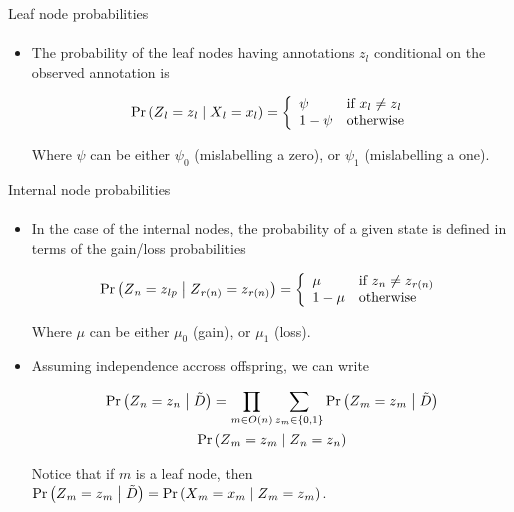 \documentclass[9pt,handout,ignorenonframetext,]{beamer}
\newcommand{\Prcond}[2]{{\mbox{Pr}\left(#1\vphantom{#2}\;\right|\left.\vphantom{#1}#2\right)}}
\newcommand{\aphylo}{D{}}      %
\newcommand{\aphyloObs}{\tilde \aphylo{}} %
\newcommand{\Ann}{Z{}} %
\newcommand{\ann}{z{}} %
\newcommand{\AnnObs}{X{}}
\newcommand{\annObs}{x{}}
\begin{document}
\begin{frame}[t,label=leafnodesprob]{Leaf node probabilities}

\framesubtitle{\hyperlink{peelingalgorithm<2>}{}}

\begin{itemize}
\item
  The probability of the leaf nodes having annotations \(\ann_l\)
  conditional on the observed annotation is

  \begin{equation}
  \label{eq:leaf1}
  \Prcond{\Ann_{l} = \ann_{l}}{\AnnObs_{l} = \annObs_{l}} = \left\{
  \begin{array}{ll}
  \psi &\mbox{if }\annObs_{l} \neq \ann_{l} \\
  1 - \psi & \mbox{otherwise}
  \end{array}
  \right.
  \end{equation}

  Where \(\psi\) can be either \(\psi_0\) (mislabelling a zero), or
  \(\psi_1\) (mislabelling a one).
\end{itemize}

\end{frame}

\begin{frame}[t,label=internalnodeprob]{Internal node probabilities}

\framesubtitle{\hyperlink{peelingalgorithm<2>}{}}

\begin{itemize}
\item
  In the case of the internal nodes, the probability of a given state is
  defined in terms of the gain/loss probabilities

  \[
  \Prcond{\Ann_{n} = \ann_{lp}}{\Ann_{r(n)} = \ann_{r(n)}} = \left\{
  \begin{array}{ll}
  \mu & \mbox{if }\ann_{n} \neq \ann_{r(n)} \\
  1 - \mu & \mbox{otherwise}
  \end{array}
  \right.
  \]

  Where \(\mu\) can be either \(\mu_0\) (gain), or \(\mu_1\) (loss).
\item
  Assuming independence accross offspring, we can write

  \begin{multline}
  \label{eq:interior1}
  \Prcond{\Ann_n = \ann_n}{\aphyloObs} = %
  \prod_{m \in O(n)} \sum_{\ann_m \in \{0,1\}} \Prcond{\Ann_m = \ann_m}{\aphyloObs} \\
  \Prcond{\Ann_{m} = \ann_{m}}{\Ann_{n} = \ann_{n}}
  \end{multline}

  Notice that if \(m\) is a leaf node, then
  \(\Prcond{\Ann_m = \ann_m}{\aphyloObs} = \Prcond{\AnnObs_m = \annObs_m}{\Ann_m = \ann_m}\).
\end{itemize}

\end{frame}
\end{document}

